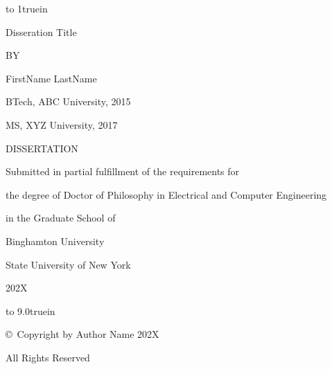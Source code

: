 \documentclass[12pt,oneside]{book}
\numberwithin{equation}{section}
\theoremstyle{plain}
\theoremstyle{definition}
\theoremstyle{remark}
\begin{document}
\frontmatter
\thispagestyle{empty}
\vbox to 1truein{}

\centerline{Disseration Title} 

\vskip 200pt


\centerline{BY}
\vskip 10pt

\centerline{FirstName LastName}
\vskip 10pt
\centerline{BTech, ABC University, 2015}
\centerline{MS, XYZ University, 2017}
\vskip 10pt



\vskip 180pt

\centerline{DISSERTATION}
\vskip 10pt
\centerline{Submitted in partial fulfillment of the requirements for}
\centerline{the degree of Doctor of Philosophy in Electrical and Computer Engineering}
\centerline{in the Graduate School of}
\centerline{Binghamton University}
\centerline{State University of New York}
\centerline{202X}

\newpage

\thispagestyle{empty}

\vbox to 9.0truein{}

\centerline{\copyright\ Copyright by Author Name 202X}

\centerline{All Rights Reserved}

\newpage
\end{document}
